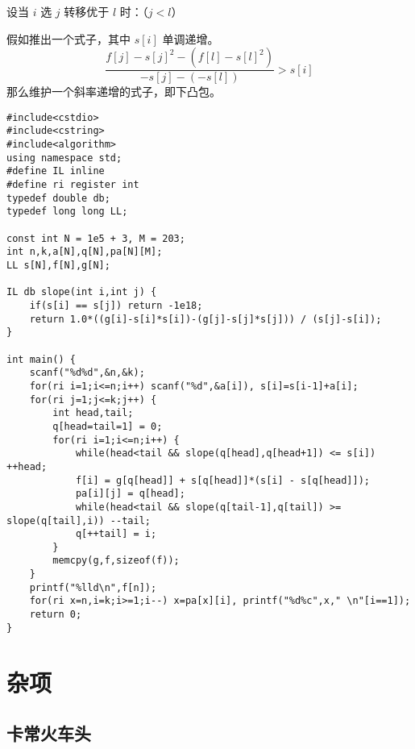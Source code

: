 \documentclass[UTF8]{ctexart}
\begin{document}
设当 $i$ 选 $j$ 转移优于 $l$ 时：（$j<l$）

假如推出一个式子，其中 $s[i]$ 单调递增。
$$
\frac{f[j]-s[j]^2-(f[l]-s[l]^2)}{-s[j]-(-s[l])} > s[i]
$$
那么维护一个斜率递增的式子，即下凸包。

\begin{framed}
\begin{lstlisting}
#include<cstdio>
#include<cstring>
#include<algorithm>
using namespace std;
#define IL inline
#define ri register int
typedef double db;
typedef long long LL;

const int N = 1e5 + 3, M = 203;
int n,k,a[N],q[N],pa[N][M];
LL s[N],f[N],g[N];

IL db slope(int i,int j) {
    if(s[i] == s[j]) return -1e18;
    return 1.0*((g[i]-s[i]*s[i])-(g[j]-s[j]*s[j])) / (s[j]-s[i]);
}

int main() {
    scanf("%d%d",&n,&k);
    for(ri i=1;i<=n;i++) scanf("%d",&a[i]), s[i]=s[i-1]+a[i];
    for(ri j=1;j<=k;j++) {
        int head,tail;
        q[head=tail=1] = 0;
        for(ri i=1;i<=n;i++) {
            while(head<tail && slope(q[head],q[head+1]) <= s[i]) ++head;
            f[i] = g[q[head]] + s[q[head]]*(s[i] - s[q[head]]);
            pa[i][j] = q[head];
            while(head<tail && slope(q[tail-1],q[tail]) >= slope(q[tail],i)) --tail;
            q[++tail] = i;
        }
        memcpy(g,f,sizeof(f));
    }
    printf("%lld\n",f[n]);
    for(ri x=n,i=k;i>=1;i--) x=pa[x][i], printf("%d%c",x," \n"[i==1]);
    return 0;
} 
\end{lstlisting}
\end{framed}

\newpage
\section{杂项}

\subsection{卡常火车头}
\end{document}
